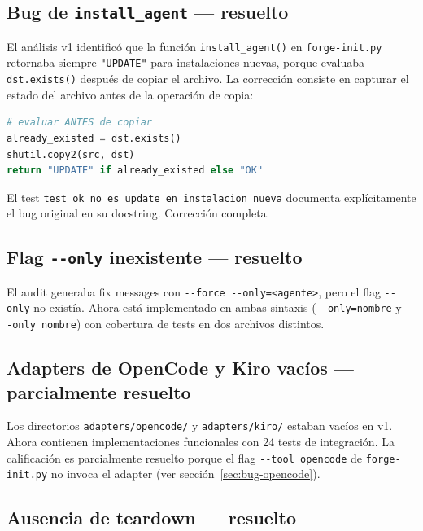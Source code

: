 \documentclass[12pt,a4paper]{article}
\begin{document}
\subsection{Bug de \texttt{install\_agent} --- resuelto}

El an\'alisis v1 identific\'o que la funci\'on \texttt{install\_agent()} en
\texttt{forge-init.py} retornaba siempre \texttt{"UPDATE"} para instalaciones
nuevas, porque evaluaba \texttt{dst.exists()} despu\'es de copiar el archivo. La
correcci\'on consiste en capturar el estado del archivo antes de la operaci\'on de
copia:

\begin{lstlisting}[language=Python, caption={Correcci\'on en forge-init.py (l\'ineas 95--105)}]
# evaluar ANTES de copiar
already_existed = dst.exists()
shutil.copy2(src, dst)
return "UPDATE" if already_existed else "OK"
\end{lstlisting}

El test \texttt{test\_ok\_no\_es\_update\_en\_instalacion\_nueva} documenta
expl\'icitamente el bug original en su docstring. Correcci\'on completa.

\subsection{Flag \texttt{-{}-only} inexistente --- resuelto}

El audit generaba fix messages con \texttt{-{}-force -{}-only=<agente>}, pero el
flag \texttt{-{}-only} no exist\'ia. Ahora est\'a implementado en ambas sintaxis
(\texttt{-{}-only=nombre} y \texttt{-{}-only nombre}) con cobertura de tests en
dos archivos distintos.

\subsection{Adapters de OpenCode y Kiro vac\'ios --- parcialmente resuelto}

Los directorios \texttt{adapters/opencode/} y \texttt{adapters/kiro/} estaban
vac\'ios en v1. Ahora contienen implementaciones funcionales con 24 tests de
integraci\'on. La calificaci\'on es parcialmente resuelto porque el flag
\texttt{-{}-tool opencode} de \texttt{forge-init.py} no invoca el adapter (ver
secci\'on~\ref{sec:bug-opencode}).

\subsection{Ausencia de teardown --- resuelto}
\end{document}
